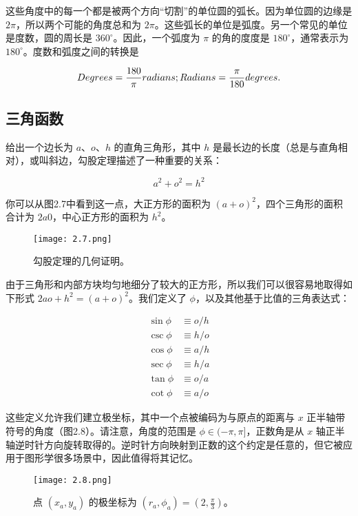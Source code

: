 \documentclass[lang=cn,12pt]{elegantbook}
\begin{document}
这些角度中的每一个都是被两个方向“切割”的单位圆的弧长。因为单位圆的边缘是 $2\pi$，所以两个可能的角度总和为 $2\pi$。这些弧长的单位是弧度。另一个常见的单位是度数，圆的周长是 $360^\circ$。因此，一个弧度为 $\pi$ 的角的度度是 $180^\circ$，通常表示为 $180^\circ$。度数和弧度之间的转换是

$$
Degrees =\frac{180}{\pi} radians; \\
Radians =\frac{\pi}{180} degrees.
$$

\subsection{三角函数}

给出一个边长为 $a$、$o$、$h$ 的直角三角形，其中 $h$ 是最长边的长度（总是与直角相对），或叫斜边，勾股定理描述了一种重要的关系：

$$
a^2+o^2=h^2
$$

你可以从图2.7中看到这一点，大正方形的面积为 $(a+o)^2$，四个三角形的面积合计为 $2a0$，中心正方形的面积为 $h^2$。


\begin{figure}[htbp]
\centering
\texttt{[image: 2.7.png]}
\caption{勾股定理的几何证明。}
\end{figure}

由于三角形和内部方块均匀地细分了较大的正方形，所以我们可以很容易地取得如下形式 $2ao+h^2=(a+o)^2$。我们定义了 $\phi$，以及其他基于比值的三角表达式：

$$
\begin{aligned}
\sin \phi & \equiv o / h \\
\csc \phi & \equiv h / o \\
\cos \phi & \equiv a / h \\
\sec \phi & \equiv h / a \\
\tan \phi & \equiv o / a \\
\cot \phi & \equiv a / o
\end{aligned}
$$

这些定义允许我们建立极坐标，其中一个点被编码为与原点的距离与 $x$ 正半轴带符号的角度（图2.8）。请注意，角度的范围是 $\phi\in(-\pi,\pi]$，正数角是从 $x$ 轴正半轴逆时针方向旋转取得的。逆时针方向映射到正数的这个约定是任意的，但它被应用于图形学很多场景中，因此值得将其记忆。

\begin{figure}[htbp]
\centering
\texttt{[image: 2.8.png]}
\caption{点 $(x_a,y_a)$ 的极坐标为 $(r_a,\phi_a)=(2,\frac{\pi}{3})$。}
\end{figure}
\end{document}
